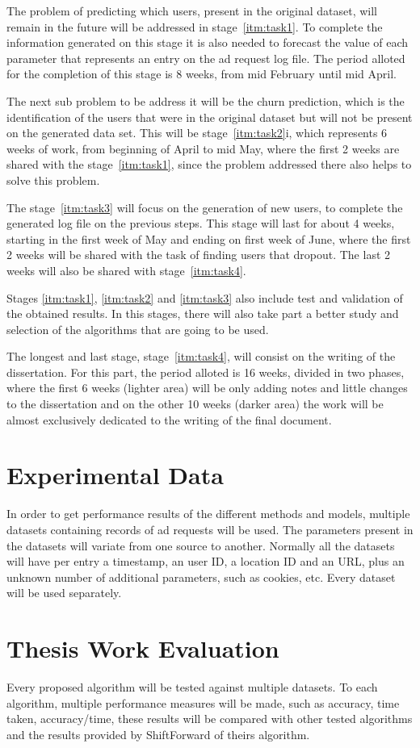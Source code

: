 The problem of predicting which users, present in the original dataset, will remain
in the future will be addressed in stage~\ref{itm:task1}. To complete the
information generated on this stage it is also needed to forecast the value of
each parameter that represents an entry on the ad request log file. The period
alloted for the completion of this stage is 8 weeks, from mid February until mid
April.

The next sub problem to be address it will be the churn prediction, which is the
identification of the users that were in the original dataset but will not be present on the generated
data set. This will be stage~\ref{itm:task2}i, which represents 6 weeks of
work, from beginning of April to mid May,
where the first 2 weeks are shared with the stage~\ref{itm:task1}, since the problem
addressed there also helps to solve this problem.

The stage~\ref{itm:task3} will focus on the generation of new users, to complete the
generated log file on the previous steps. This stage will last for about 4
weeks, starting in the first week of May and ending on first week of June, where the first 2
weeks will be shared with the task of finding users that dropout. The last 2
weeks will also be shared with stage~\ref{itm:task4}.

Stages \ref{itm:task1}, \ref{itm:task2} and \ref{itm:task3} also include test
and validation of the obtained results. In this stages, there will also take part
a better study and selection of the algorithms that are going to be used.

The longest and last stage, stage~\ref{itm:task4}, will consist on the writing of the
dissertation. For this part, the period alloted is 16 weeks, divided in two
phases, where the first 6 weeks (lighter area) will be only adding notes and little changes to the
dissertation and on the other 10 weeks (darker area) the work will be almost exclusively dedicated
to the writing of the final document.


\section{Experimental Data}

In order to get performance results of the different methods and models,
multiple datasets containing records of ad requests will be used. The parameters
present in the datasets will variate from one source to another. Normally all
the datasets will have per entry a timestamp, an user ID, a location ID and an
URL, plus an unknown number of additional parameters, such as cookies, etc.
Every dataset will be used separately.

\section{Thesis Work Evaluation}

Every proposed algorithm will be tested against multiple datasets. To each
algorithm, multiple performance measures will be made, such as accuracy, time taken,
accuracy/time, these results will be compared with other tested algorithms and
the results provided by ShiftForward of theirs algorithm.
